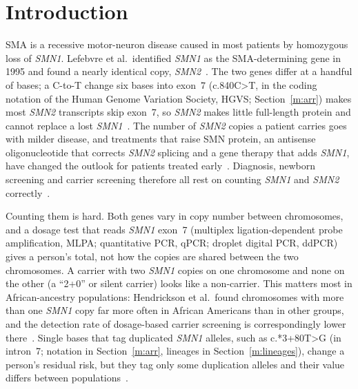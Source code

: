 \documentclass[10pt]{article}
\newcommand{\cpe}{c.*3+80T>G}
\begin{document}
\begin{center}
\end{center}

\section{Introduction}\label{m:intro}
SMA is a recessive motor-neuron disease caused in most patients by homozygous loss of \emph{SMN1}. Lefebvre et
al.\ identified \emph{SMN1} as the SMA-determining gene in 1995 and found a nearly identical copy,
\emph{SMN2}~\cite{lefebvre1995}. The two genes differ at a handful of bases; a C-to-T change six bases into exon~7
(c.840C>T, in the coding notation of the Human Genome Variation Society, HGVS; Section~\ref{m:arr}) makes most \emph{SMN2} transcripts skip exon~7, so \emph{SMN2} makes little full-length protein and cannot
replace a lost \emph{SMN1}~\cite{lorson1999,monani1999}. The number of \emph{SMN2} copies a patient carries goes with
milder disease, and treatments that raise SMN protein, an antisense oligonucleotide that corrects \emph{SMN2} splicing
and a gene therapy that adds \emph{SMN1}, have changed the outlook for patients treated
early~\cite{mercuri2022,finkel2017,mendell2017}. Diagnosis, newborn screening and carrier screening therefore all rest
on counting \emph{SMN1} and \emph{SMN2} correctly~\cite{prior2008}.

Counting them is hard. Both genes vary in copy number between chromosomes, and a dosage test that reads
\emph{SMN1} exon~7 (multiplex ligation-dependent probe amplification, MLPA; quantitative PCR, qPCR; droplet digital
PCR, ddPCR) gives a person's total, not how the copies are shared between the two
chromosomes. A carrier with two \emph{SMN1} copies on one chromosome and none on the other (a ``2+0'' or silent
carrier) looks like a non-carrier. This matters most in African-ancestry populations: Hendrickson et al.\ found
chromosomes with more than one \emph{SMN1} copy far more often in African Americans than in other groups, and the
detection rate of dosage-based carrier screening is correspondingly lower there~\cite{hendrickson2009,sugarman2012}.
Single bases that tag duplicated \emph{SMN1} alleles, such as \cpe{} (in intron~7; notation in Section~\ref{m:arr}, lineages in Section~\ref{m:lineages}), change a person's residual risk, but they tag
only some duplication alleles and their value differs between
populations~\cite{luo2014,feng2017,milligan2021,mikhalchuk2025}.
\end{document}
